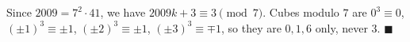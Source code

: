 Since $2009=7^2\cdot41$, we have $2009k+3\equiv3\pmod7$. Cubes modulo $7$ are $0^3\equiv0$, $(\pm1)^3\equiv\pm1$, $(\pm2)^3\equiv\pm1$, $(\pm3)^3\equiv\mp1$, so they are $0,1,6$ only, never $3$. $\blacksquare$
